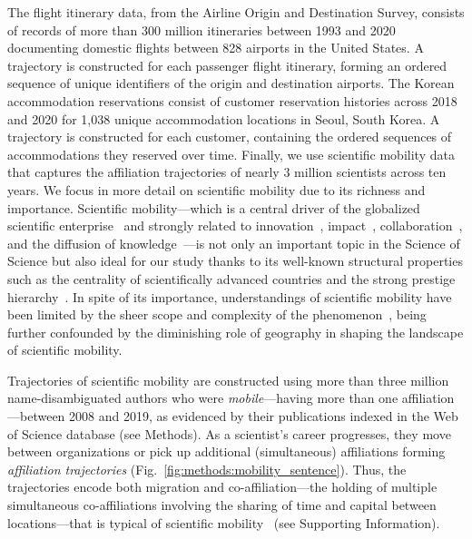 \documentclass[12pt]{article} %
\def\SI{Supporting Information}
\begin{document}
The flight itinerary data, from the Airline Origin and Destination Survey, consists of records of more than 300 million itineraries between 1993 and 2020 documenting domestic flights between 828 airports in the United States.
A trajectory is constructed for each passenger flight itinerary, forming an ordered sequence of unique identifiers of the origin and destination airports.
The Korean accommodation reservations consist of customer reservation histories across 2018 and 2020 for 1,038 unique accommodation locations in Seoul, South Korea.
A trajectory is constructed for each customer, containing the ordered sequences of accommodations they reserved over time.
Finally, we use scientific mobility data that captures the affiliation trajectories of nearly 3 million scientists across ten years.
We focus in more detail on scientific mobility due to its richness and importance.
Scientific mobility---which is a central driver of the globalized scientific enterprise~\autocite{czaika2018globalisation, box2008competition} and strongly related to innovation~\autocite{braunerhjelm2020labor, kaiser2018innovation}, impact~\autocite{sugimoto2017mostimpact, petersen2018multiscale}, collaboration~\autocite{rodrigues2016mobility}, and the diffusion of knowledge~\autocite{braunerhjelm2020labor, morgan2018prestige}---is not only an important topic in the Science of Science but also ideal for our study thanks to its well-known structural properties such as the centrality of scientifically advanced countries and the strong prestige hierarchy~\autocite{clauset2015hierarchy, deville2014career}.
In spite of its importance, understandings of scientific mobility have been limited by the sheer scope and complexity of the phenomenon~\autocite{robinson2019mobility, deville2014career}, being further confounded by the diminishing role of geography in shaping the landscape of scientific mobility.

Trajectories of scientific mobility are constructed using more than three million name-disambiguated authors who were \textit{mobile}---having more than one affiliation---between 2008 and 2019, as evidenced by their publications indexed in the Web of Science database (see Methods).
As a scientist's career progresses, they move between organizations or pick up additional (simultaneous) affiliations forming \textit{affiliation trajectories} (Fig.~\ref{fig:methods:mobility_sentence}).
Thus, the trajectories encode both migration and co-affiliation---the holding of multiple simultaneous co-affiliations involving the sharing of time and capital between locations---that is typical of scientific mobility~\autocite{rodrigues2016mobility, sugimoto2017mostimpact} (see \SI).
\end{document}
